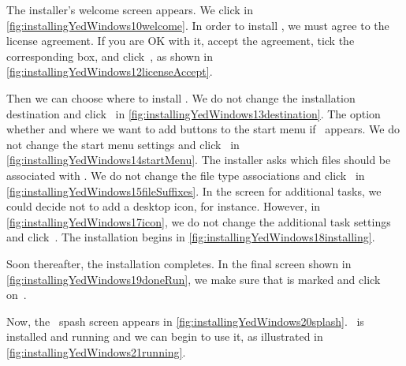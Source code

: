 The installer's welcome screen appears.
We click  in \cref{fig:installingYedWindows10welcome}.
In order to install \yEd, we must agree to the license agreement.
If you are OK with it, accept the agreement, tick the corresponding box, and click~, as shown in \cref{fig:installingYedWindows12licenseAccept}.

Then we can choose where to install \yEd.
We do not change the installation destination and click~ in \cref{fig:installingYedWindows13destination}.
The option whether and where we want to add buttons to the start menu if \microsoftWindows\ appears.
We do not change the start menu settings and click~ in \cref{fig:installingYedWindows14startMenu}.
The installer asks which files should be associated with \yEd.
We do not change the file type associations and click~ in \cref{fig:installingYedWindows15fileSuffixes}.
In the screen for additional tasks, we could decide not to add a desktop icon, for instance.
However, in \cref{fig:installingYedWindows17icon}, we do not change the additional task settings and click~.
The installation begins in \cref{fig:installingYedWindows18installing}.

Soon thereafter, the installation completes.
In the final screen shown in \cref{fig:installingYedWindows19doneRun}, we make sure that  is marked and click on~.

Now, the \yEd\ spash screen appears in \cref{fig:installingYedWindows20splash}.
\yEd\ is installed and running and we can begin to use it, as illustrated in \cref{fig:installingYedWindows21running}.%
%
\FloatBarrier%
\endhsection%
%
